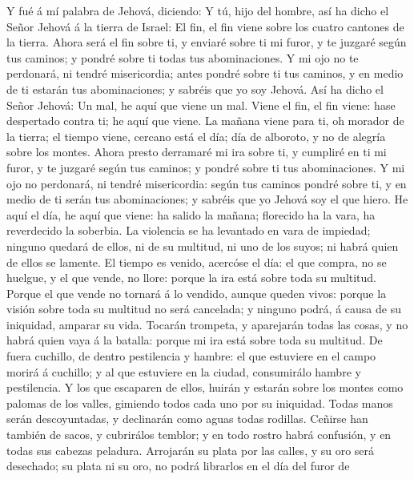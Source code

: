  Y fué á mí palabra de Jehová, diciendo:  Y tú,
hijo del hombre, así ha dicho el Señor Jehová á la tierra de Israel: El
fin, el fin viene sobre los cuatro cantones de la tierra. 
Ahora será el fin sobre ti, y enviaré sobre ti mi furor, y te juzgaré
según tus caminos; y pondré sobre ti todas tus abominaciones.
 Y mi ojo no te perdonará, ni tendré misericordia; antes
pondré sobre ti tus caminos, y en medio de ti estarán tus abominaciones;
y sabréis que yo soy Jehová.  Así ha dicho el Señor Jehová:
Un mal, he aquí que viene un mal.  Viene el fin, el fin
viene: hase despertado contra ti; he aquí que viene.  La
mañana viene para ti, oh morador de la tierra; el tiempo viene, cercano
está el día; día de alboroto, y no de alegría sobre los montes.
 Ahora presto derramaré mi ira sobre ti, y cumpliré en ti mi
furor, y te juzgaré según tus caminos; y pondré sobre ti tus
abominaciones.  Y mi ojo no perdonará, ni tendré
misericordia: según tus caminos pondré sobre ti, y en medio de ti serán
tus abominaciones; y sabréis que yo Jehová soy el que hiero.
 He aquí el día, he aquí que viene: ha salido la mañana;
florecido ha la vara, ha reverdecido la soberbia.  La
violencia se ha levantado en vara de impiedad; ninguno quedará de ellos,
ni de su multitud, ni uno de los suyos; ni habrá quien de ellos se
lamente.  El tiempo es venido, acercóse el día: el que
compra, no se huelgue, y el que vende, no llore: porque la ira está
sobre toda su multitud.  Porque el que vende no tornará á
lo vendido, aunque queden vivos: porque la visión sobre toda su multitud
no será cancelada; y ninguno podrá, á causa de su iniquidad, amparar su
vida.  Tocarán trompeta, y aparejarán todas las cosas, y no
habrá quien vaya á la batalla: porque mi ira está sobre toda su
multitud.  De fuera cuchillo, de dentro pestilencia y
hambre: el que estuviere en el campo morirá á cuchillo; y al que
estuviere en la ciudad, consumirálo hambre y pestilencia. 
Y los que escaparen de ellos, huirán y estarán sobre los montes como
palomas de los valles, gimiendo todos cada uno por su iniquidad.
 Todas manos serán descoyuntadas, y declinarán como aguas
todas rodillas.  Ceñirse han también de sacos, y cubrirálos
temblor; y en todo rostro habrá confusión, y en todas sus cabezas
peladura.  Arrojarán su plata por las calles, y su oro será
desechado; su plata ni su oro, no podrá librarlos en el día del furor de

